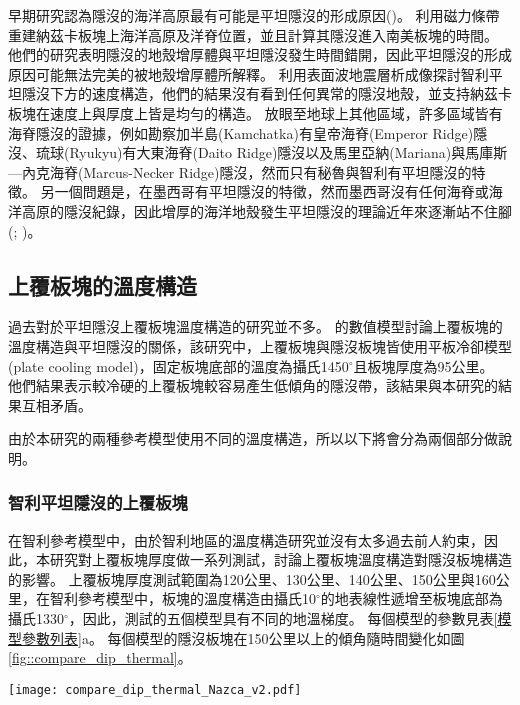 早期研究認為隱沒的海洋高原最有可能是平坦隱沒的形成原因(\citealp{gutscher2002andean})。
\citealp{Skinner2013}利用磁力條帶重建納茲卡板塊上海洋高原及洋脊位置，並且計算其隱沒進入南美板塊的時間。
他們的研究表明隱沒的地殼增厚體與平坦隱沒發生時間錯開，因此平坦隱沒的形成原因可能無法完美的被地殼增厚體所解釋。
\citealp{Marot2014}利用表面波地震層析成像探討智利平坦隱沒下方的速度構造，他們的結果沒有看到任何異常的隱沒地殼，並支持納茲卡板塊在速度上與厚度上皆是均勻的構造。
放眼至地球上其他區域，許多區域皆有海脊隱沒的證據，例如勘察加半島(Kamchatka)有皇帝海脊(Emperor Ridge)隱沒、琉球(Ryukyu)有大東海脊(Daito Ridge)隱沒以及馬里亞納(Mariana)與馬庫斯—內克海脊(Marcus-Necker Ridge)隱沒，然而只有秘魯與智利有平坦隱沒的特徵。
另一個問題是，在墨西哥有平坦隱沒的特徵，然而墨西哥沒有任何海脊或海洋高原的隱沒紀錄，因此增厚的海洋地殼發生平坦隱沒的理論近年來逐漸站不住腳(\citealp{schellart2020control}; \citealp{Schellart2021})。

\subsection{上覆板塊的溫度構造}
過去對於平坦隱沒上覆板塊溫度構造的研究並不多。
\citealp{Thermal2012}的數值模型討論上覆板塊的溫度構造與平坦隱沒的關係，該研究中，上覆板塊與隱沒板塊皆使用平板冷卻模型(plate cooling model)，固定板塊底部的溫度為攝氏1450$^\circ$且板塊厚度為95公里。
他們結果表示較冷硬的上覆板塊較容易產生低傾角的隱沒帶，該結果與本研究的結果互相矛盾。

由於本研究的兩種參考模型使用不同的溫度構造，所以以下將會分為兩個部分做說明。

\subsubsection{智利平坦隱沒的上覆板塊}
在智利參考模型中，由於智利地區的溫度構造研究並沒有太多過去前人約束，因此，本研究對上覆板塊厚度做一系列測試，討論上覆板塊溫度構造對隱沒板塊構造的影響。
上覆板塊厚度測試範圍為120公里、130公里、140公里、150公里與160公里，在智利參考模型中，板塊的溫度構造由攝氏10$^\circ$的地表線性遞增至板塊底部為攝氏1330$^\circ$，因此，測試的五個模型具有不同的地溫梯度。
每個模型的參數見表\ref{模型參數列表}a。
每個模型的隱沒板塊在150公里以上的傾角隨時間變化如圖\ref{fig::compare_dip_thermal}。

\begin{figure*}[ht!]
    \centering
    \texttt{[image: compare\_dip\_thermal\_Nazca\_v2.pdf]}
    \caption[測試上覆板塊厚度模型之150公里以上隱沒傾角隨時間變化]{測試上覆板塊厚度模型之150公里以上隱沒傾角隨時間變化。}
    \label{fig::compare_dip_thermal}
\end{figure*}

